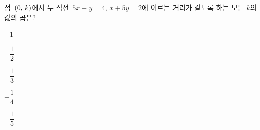 점~$(0,\mkern3mu k)$에서 두 직선~$5x-y=4$, $x+5y=2$에 이르는 거리가 같도록 하는 모든 $k$의 값의 곱은?
\begin{choices32}{\rule[-3ex]{0pt}{8ex}$-1$}{\rule[-3ex]{0pt}{8ex}$-\dfrac{1}{2}$}{\rule[-3ex]{0pt}{8ex}$-\dfrac{1}{3}$}{\rule[-3ex]{0pt}{8ex}$-\dfrac{1}{4}$}{\rule[-3ex]{0pt}{8ex}$-\dfrac{1}{5}$}\end{choices32}
